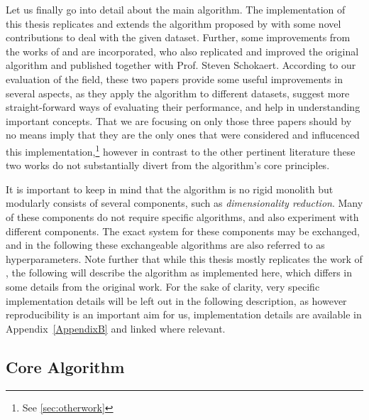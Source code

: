 Let us finally go into detail about the main algorithm. The implementation of this thesis replicates and extends the algorithm proposed by \textcite{Derrac2015} with some novel contributions to deal with the given dataset. Further, some improvements from the works of \textcite{Ager2018} and \textcite{Alshaikh2020} are incorporated, who also replicated and improved the original algorithm and published together with Prof. Steven Schokaert. According to our evaluation of the field, these two papers provide some useful improvements in several aspects, as they apply the algorithm to different datasets, suggest more straight-forward ways of evaluating their performance, and help in understanding important concepts. That we are focusing on only those three papers should by no means imply that they are the only ones that were considered and influcenced this implementation,\footnote{See \autoref{sec:otherwork}} however in contrast to the other pertinent literature these two works do not substantially divert from the algorithm's core principles.

It is important to keep in mind that the algorithm is no rigid monolith but modularly consists of several components, such as \textit{dimensionality reduction}. Many of these components do not require specific algorithms, and \mainalgos also experiment with different components. The exact system for these components may be exchanged, and in the following these exchangeable algorithms are also referred to as hyperparameters. Note further that while this thesis mostly replicates the work of \textcite{Derrac2015}, the following will describe the algorithm as implemented here, which differs in some details from the original work. For the sake of clarity, very specific implementation details will be left out in the following description, as however reproducibility is an important aim for us, implementation details are available in Appendix~\ref{AppendixB} and linked where relevant. %

\subsection*{Core Algorithm}

